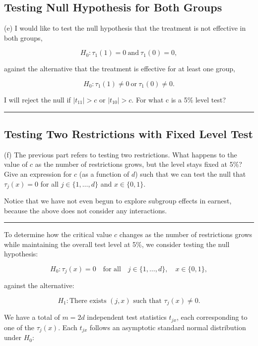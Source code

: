 \documentclass{article}
\newenvironment{colorparagraph}[1]{\par\color{#1}}{\par}
\begin{document}
\begin{colorparagraph}{questioncolor}
\label{q1e}\subsection{Testing Null Hypothesis for Both Groups}
(e) I would like to test the null hypothesis that the treatment is not effective in both groups,

\[
H_0 : \tau_1(1) = 0 \ \text{and} \ \tau_1(0) = 0,
\]

against the alternative that the treatment is effective for at least one group,

\[
H_0 : \tau_1(1) \neq 0 \ \text{or} \ \tau_1(0) \neq 0.
\]

I will reject the null if \( |t_{11}| > c \) or \( |t_{10}| > c \). For what c is a 5\% level test?

\rule{\textwidth}{0.5pt}
\end{colorparagraph}

\begin{colorparagraph}{questioncolor}
\label{q1f}\subsection{Testing Two Restrictions with Fixed Level Test}
(f) The previous part refers to testing two restrictions. What happens to the value of \( c \) as the number of restrictions grows, but the level stays fixed at 5\%? Give an expression for \( c \) (as a function of \( d \)) such that we can test the null that \( \tau_j(x) = 0 \) for all \( j \in \{1, \dots, d\} \) and \( x \in \{0,1\} \).

Notice that we have not even begun to explore subgroup effects in earnest, because the above does not consider any interactions.

\rule{\textwidth}{0.5pt}
\end{colorparagraph}

To determine how the critical value \( c \) changes as the number of restrictions grows while maintaining the overall test level at 5\%, we consider testing the null hypothesis:

\[
H_0 : \tau_j(x) = 0 \quad \text{for all} \quad j \in \{1, \dots, d\}, \quad x \in \{0,1\},
\]

against the alternative:

\[
H_1 : \text{There exists } (j, x) \text{ such that } \tau_j(x) \neq 0.
\]

We have a total of \( m = 2d \) independent test statistics \( t_{jx} \), each corresponding to one of the \( \tau_j(x) \). Each \( t_{jx} \) follows an asymptotic standard normal distribution under \( H_0 \):
\end{document}
